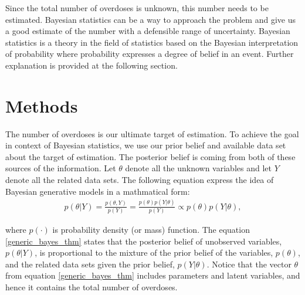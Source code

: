 \documentclass[12pt]{article}
\begin{document}
Since the total number of overdoses is unknown, this number needs to be estimated. Bayesian statistics can be a way to approach the problem and give us a good estimate of the number with a defensible range of uncertainty. Bayesian statistics is a theory in the field of statistics based on the Bayesian interpretation of probability where probability expresses a degree of belief in an event. \cite{wiki_bayes} Further explanation is provided at the following section.\\


\section{Methods}

\normalsize 
The number of overdoses is our ultimate target of estimation. To achieve the goal in context of Bayesian statistics, we use our prior belief and available data set about the target of estimation. The posterior belief is coming from both of these sources of the information. Let $\theta$ denote all the unknown variables and let $Y$ denote all the related data sets. The following equation express the idea of Bayesian generative models in a mathmatical form:
\begin{equation}
\label{generic_bayes_thm}
\left.\begin{aligned}
p(\theta| Y ) = \frac{ p(\theta, Y)   }{ p(Y)} = \frac{ p(\theta) p(Y|\theta)}{ p(Y)} \propto p(\theta) p(Y| \theta), \end{aligned}\right.
\end{equation}

where $p(\cdot)$ is probability density (or mass) function. The equation \ref{generic_bayes_thm} states that the posterior belief of unobserved variables, $p(\theta|Y)$, is proportional to the mixture of the prior belief of the variables, $p(\theta)$, and the related data sets given the prior belief, $p(Y|\theta)$. Notice that the vector $\theta$ from equation \ref{generic_bayes_thm} includes parameters and latent variables, and hence it contains the total number of overdoses. \\
\end{document}

